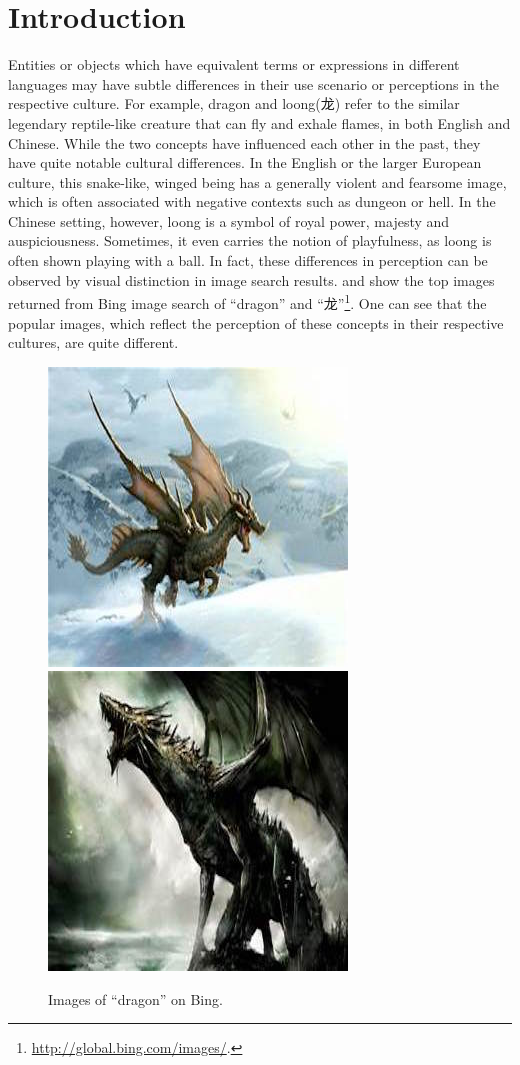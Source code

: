 \section{Introduction}

Entities or objects which have equivalent terms or expressions
in different languages may have subtle differences in 
their use scenario or perceptions in the respective culture.
For example, dragon and loong(龙) refer to the similar legendary
reptile-like creature that can fly and exhale flames, 
in both English and Chinese. While the two concepts have influenced
each other in the past, they have quite notable cultural differences. 
In the English or the larger European culture, 
this snake-like, winged being has a generally violent
and fearsome image, which is often associated with negative 
contexts such as dungeon or hell. In the Chinese setting, however,
loong is a symbol of royal power, majesty and auspiciousness. Sometimes,
it even carries the notion of playfulness, as loong is often shown
playing with a ball. In fact, these differences in perception 
can be observed by visual distinction in image search results.
 and  show the top images 
returned from Bing image
search of ``dragon'' and ``龙''\footnote{\url{http://global.bing.com/images/}.}. One can see that the popular images,
which reflect the perception of these concepts in their respective
cultures, are quite different. 

\begin{figure}[th]
\centering
\includegraphics[width=0.49\columnwidth]{img/dragon1}
\hfill
\includegraphics[width=0.49\columnwidth]{img/dragon2}
%
\caption{Images of ``dragon'' on Bing.}
\label{fig:dragon}
\end{figure}

